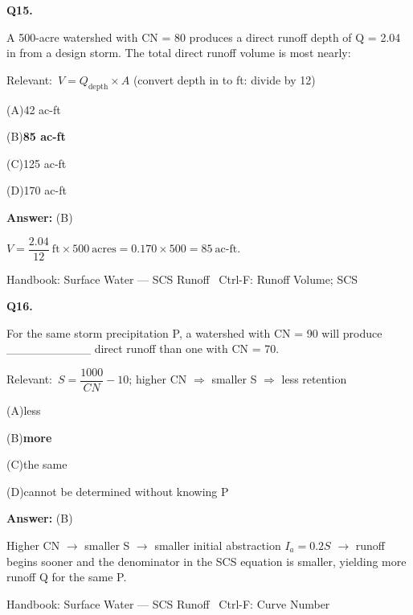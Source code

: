 \documentclass[11pt]{article}
\newcommand{\correct}[1]{\textbf{#1}\;{\color{accent}$\checkmark$}}
\newcommand{\optline}[2]{\par\noindent\hspace{1.2em}(#1)\hspace{0.6em}#2}
\begin{document}
\vspace{9pt}
\filbreak
\textbf{\color{accent}Q15.}\par\vspace{2pt}
A 500-acre watershed with CN = 80 produces a direct runoff depth of Q = 2.04 in from a design storm. The total direct runoff volume is most nearly:\par\vspace{3pt}
{\small\color{soft}Relevant:}\ $V = Q_{\text{depth}}\times A$ (convert depth in to ft: divide by 12)\par\vspace{3pt}
\optline{A}{42 ac-ft}
\optline{B}{\correct{85 ac-ft}}
\optline{C}{125 ac-ft}
\optline{D}{170 ac-ft}
\par\vspace{3pt}
\vspace{2pt}\par\noindent\colorbox{boxbg}{\parbox{\dimexpr\linewidth-2\fboxsep\relax}{%
\vspace{2pt}\textbf{Answer:} (B)\par\vspace{2pt}
{\small $V = \dfrac{2.04}{12}\ \mathrm{ft} \times 500\ \mathrm{acres} = 0.170 \times 500 = 85\ \mathrm{ac\text{-}ft}$.}\par\vspace{2pt}
{\footnotesize\color{soft}Handbook: Surface Water --- SCS Runoff \textbullet\ Ctrl-F: Runoff Volume; SCS}\vspace{2pt}
}}
\vspace{9pt}
\filbreak
\textbf{\color{accent}Q16.}\par\vspace{2pt}
For the same storm precipitation P, a watershed with CN = 90 will produce \_\_\_\_\_\_\_\_\_\_ direct runoff than one with CN = 70.\par\vspace{3pt}
{\small\color{soft}Relevant:}\ $S = \dfrac{1000}{CN} - 10$; higher CN $\Rightarrow$ smaller S $\Rightarrow$ less retention\par\vspace{3pt}
\optline{A}{less}
\optline{B}{\correct{more}}
\optline{C}{the same}
\optline{D}{cannot be determined without knowing P}
\par\vspace{3pt}
\vspace{2pt}\par\noindent\colorbox{boxbg}{\parbox{\dimexpr\linewidth-2\fboxsep\relax}{%
\vspace{2pt}\textbf{Answer:} (B)\par\vspace{2pt}
{\small Higher CN $\rightarrow$ smaller S $\rightarrow$ smaller initial abstraction $I_a = 0.2S$ $\rightarrow$ runoff begins sooner and the denominator in the SCS equation is smaller, yielding more runoff Q for the same P.}\par\vspace{2pt}
{\footnotesize\color{soft}Handbook: Surface Water --- SCS Runoff \textbullet\ Ctrl-F: Curve Number}\vspace{2pt}
}}
\end{document}

